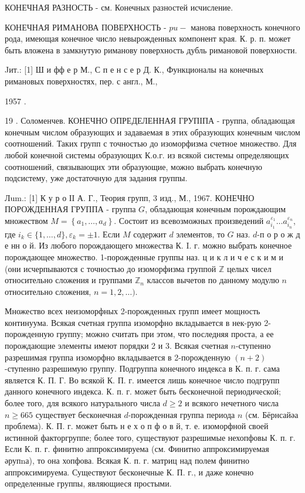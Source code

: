 \documentclass[10pt]{article}
\begin{document}
КОНЕЧНАЯ РАЗНОСТЬ - см. Конечных разностей исчисление.



КОНЕЧНАЯ РИМАНОВА ПОВЕРХНОСТЬ - $p u-$ манова поверхность конечного рода, имеющая конечное число невырожденных компонент края. К. р. п. может быть вложена в замкнутую риманову поверхность дубль римановой поверхности.



Jит.: [1] Ш и фф е р М., С п е н с е р Д. К., Функционалы на конечных римановых поверхностях, пер. с англ., М.,

1957 .

19 . Соломенчев. КОНЕЧНО ОПРЕДЕЛЕННАЯ ГРУПІПА - группа, обладающая конечным числом образующих и задаваемая в этих образующих конечным числом соотношений. Таких групп с точностью до изоморфизма счетное множество. Для любой конечной системы образующих К.о.г. из всякой системы определяющих соотношений, связывающих эти образующие, можно выбрать конечную подсистему, уже достаточную для задания группы.



Лum.: [1] К у р о ІІ А. Г., Теория групп, 3 изд., М., 1967. КОНЕЧНО ПОРОЖДЕННАЯ ГРУППА - группа $G$, обладающая конечным порождающим множеством $M=\left\{a_{1}, \ldots, a_{d}\right\}$. Состоит из всевозможных произведений $a_{i_{1}}^{\varepsilon_{1}} \ldots a_{i_{n}}^{\varepsilon_{n}}$, где $i_{k} \in\{1, \ldots, d\}, \varepsilon_{k}= \pm 1$. Если $M$ содержит $d$ элементов, то $G$ наз. $d$-п о р о ж д е нн о й. Из любого порождающего множества К. I. г. можно выбрать конечное порождающее множество. 1-порожденные группы наз. ц и к л и ч е с к и м и (они исчерпываются с точностью до изоморфизма группой $\mathbb{Z}$ целых чисел относительно сложения и группами $\mathbb{Z}_{n}$ классов вычетов по данному модулю $n$ относительно сложения, $n=1,2, \ldots)$.



Множество всех неизоморфных 2-порожденных групп имеет мощность континуума. Всякая счетная группа изоморфно вкладывается в нек-рую 2-порожденную группу; можно считать при этом, что последняя проста, а ее порождающие элементы имеют порядки 2 и 3. Всякая счетная $n$-ступенно разрешимая группа изоморфно вкладывается в 2-порожденную $(n+2)$-ступенно разрешимую группу. Подгруппа конечного индекса в К. п. г. сама является К. П. Г. Во всякой К. П. г. имеется лишь конечное число подгрупп данного конечного индекса. К. п. г. может быть бесконечной периодической; более того, для всякого натурального числа $d \geqslant 2$ и всякого нечетного числа $n \geqslant 665$ существует бесконечная $d$-порожденная группа периода $n$ (см. Бёрнсайәа проблема). К. П. г. может быть н е х о п ф о в й, т. е. изоморфной своей истинной факторгруппе; более того, существуют разрешимые нехопфовы К. п. г. Если К. п. г. финитно аппроксимируема (см. Финитно аппроксимируемая әрупnа), то она хопфова. Всякая К. п. г. матриц над полем финитно аппроксимируема. Существуют бесконечные К. П. г., и даже конечно определенные группы, являющиеся простыми.
\end{document}
